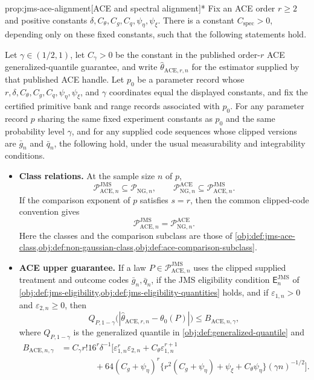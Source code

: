 \documentclass[11pt]{article}
\begin{document}
\begin{propositionv}{prop:jms-ace-alignment}[ACE and spectral alignment]*
Fix an ACE order \(r\ge2\) and positive constants
\(\delta,C_{\theta},C_g,C_q,\psi_{\eta},\psi_{\xi}\).  There is a constant
\(C_{\mathrm{spec}}>0\), depending only on these fixed constants, such that
the following statements hold.

Let \(\gamma\in(1/2,1)\), let \(C_{\gamma}>0\) be the constant in the
published order-\(r\) ACE generalized-quantile guarantee, and write
\(\widehat\theta_{\mathrm{ACE},r,n}\) for the estimator supplied by that
published ACE handle.  Let \(p_0\) be a parameter record whose
\(r,\delta,C_{\theta},C_g,C_q,\psi_{\eta},\psi_{\xi}\), and \(\gamma\)
coordinates equal the displayed constants, and fix the certified primitive
bank and range records associated with \(p_0\).  For any parameter record
\(p\) sharing the same fixed experiment constants as \(p_0\) and the same
probability level \(\gamma\), and for any supplied code sequences whose clipped
versions are \(\bar g_n\) and \(\bar q_n\), the following hold, under the
usual measurability and integrability conditions.

\begin{itemize}
\item \textbf{Class relations.} At the sample size \(n\) of \(p\),
\[
 \mathcal P_{\mathrm{ACE},n}^{\mathrm{JMS}}
 \subseteq \mathcal P_{\mathrm{NG},n},
 \qquad
 \mathcal P_{\mathrm{NG},n}^{\mathrm{ACE}}
 \subseteq \mathcal P_{\mathrm{ACE},n}^{\mathrm{JMS}}.
\]
If the comparison exponent of \(p\) satisfies \(s=r\), then the common clipped-code convention gives
\[
 \mathcal P_{\mathrm{ACE},n}^{\mathrm{JMS}}
 =\mathcal P_{\mathrm{NG},n}^{\mathrm{ACE}}.
\]
Here the classes and the comparison subclass are those of
\cref{obj:def:jms-ace-class,obj:def:non-gaussian-class,obj:def:ace-comparison-subclass}.

\item \textbf{ACE upper guarantee.} If a law \(P\in\mathcal P_{\mathrm{ACE},n}^{\mathrm{JMS}}\)
uses the clipped supplied treatment and outcome codes \(\bar g_n,\bar q_n\),
if the JMS eligibility condition \(\mathsf E_n^{\mathrm{JMS}}\) of
\cref{obj:def:jms-eligibility,obj:def:jms-eligibility-quantities} holds,
and if \(\varepsilon_{1,n}>0\) and \(\varepsilon_{2,n}\ge0\), then
\[
 Q_{P,1-\gamma}
 \bigl(|\widehat\theta_{\mathrm{ACE},r,n}-\theta_0(P)|\bigr)
 \le B_{\mathrm{ACE},n,\gamma},
\]
where \(Q_{P,1-\gamma}\) is the generalized quantile in
\cref{obj:def:generalized-quantile} and
\[
\begin{aligned}
 B_{\mathrm{ACE},n,\gamma}
 &= C_{\gamma} r!16^r\delta^{-1}
 \Big[
   \varepsilon_{1,n}^r\varepsilon_{2,n}
   + C_{\theta}\varepsilon_{1,n}^{r+1}  \\
 &\qquad\qquad
   +64(C_g+\psi_{\eta})^r
   \{r^2(C_g+\psi_{\eta})+\psi_{\xi}+C_{\theta}\psi_{\eta}\}
   (\gamma n)^{-1/2}
 \Big].
\end{aligned}
\]


\end{itemize}
\end{propositionv}
\end{document}
